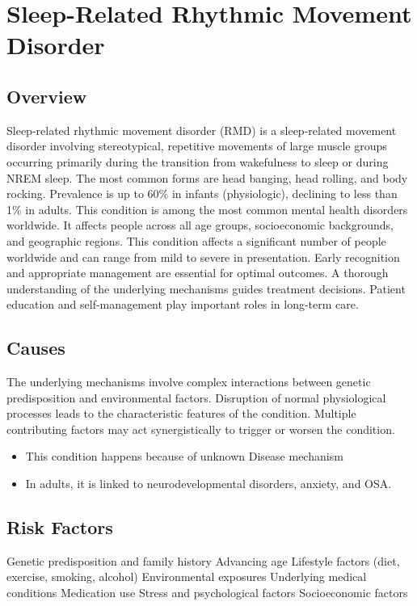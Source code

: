 \chapter{Sleep-Related Rhythmic Movement Disorder}
\label{sec:Sleep-Related Rhythmic Movement Disorder}

\section{Overview}
Sleep-related rhythmic movement disorder (RMD) is a sleep-related movement disorder involving stereotypical, repetitive movements of large muscle groups occurring primarily during the transition from wakefulness to sleep or during NREM sleep. The most common forms are head banging, head rolling, and body rocking. Prevalence is up to 60\% in infants (physiologic), declining to less than 1\% in adults. This condition is among the most common mental health disorders worldwide. It affects people across all age groups, socioeconomic backgrounds, and geographic regions. This condition affects a significant number of people worldwide and can range from mild to severe in presentation. Early recognition and appropriate management are essential for optimal outcomes. A thorough understanding of the underlying mechanisms guides treatment decisions. Patient education and self-management play important roles in long-term care.
\section{Causes}
The underlying mechanisms involve complex interactions between genetic predisposition and environmental factors. Disruption of normal physiological processes leads to the characteristic features of the condition. Multiple contributing factors may act synergistically to trigger or worsen the condition.

\begin{itemize}[noitemsep]
  \item This condition happens because of unknown Disease mechanism
  \item In adults, it is linked to neurodevelopmental disorders, anxiety, and OSA.
\end{itemize}
\section{Risk Factors}
Genetic predisposition and family history Advancing age Lifestyle factors (diet, exercise, smoking, alcohol) Environmental exposures Underlying medical conditions Medication use Stress and psychological factors Socioeconomic factors

